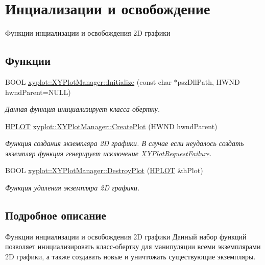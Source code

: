 \hypertarget{group__group1}{\section{Инциализации и освобождение}
\label{group__group1}
}


Функции инциализации и освобождения 2\-D графики  


\subsection*{Функции}
\begin{DoxyCompactItemize}
\item 
B\-O\-O\-L \hyperlink{group__group1_ga894a76ee9162ccae431581ed25c5029f}{xyplot\-::\-X\-Y\-Plot\-Manager\-::\-Initialize} (const char $\ast$psz\-Dll\-Path, H\-W\-N\-D hwnd\-Parent=N\-U\-L\-L)
\begin{DoxyCompactList}\small\item\em Данная функция инициализирует класса-\/обертку. \end{DoxyCompactList}\item 
\hyperlink{classxyplot_1_1_h_p_l_o_t}{H\-P\-L\-O\-T} \hyperlink{group__group1_ga056dc5f3c798c3c3f38d2ac9d4051ecb}{xyplot\-::\-X\-Y\-Plot\-Manager\-::\-Create\-Plot} (H\-W\-N\-D hwnd\-Parent)
\begin{DoxyCompactList}\small\item\em Функция создания экземпляра 2\-D графики. В случае если неудалось создать экземпляр функция генерирует исключение \hyperlink{classxyplot_1_1_x_y_plot_request_failure}{X\-Y\-Plot\-Request\-Failure}. \end{DoxyCompactList}\item 
B\-O\-O\-L \hyperlink{group__group1_gaa1d4729bae2ddfd134d72fcab62930d5}{xyplot\-::\-X\-Y\-Plot\-Manager\-::\-Destroy\-Plot} (\hyperlink{classxyplot_1_1_h_p_l_o_t}{H\-P\-L\-O\-T} \&h\-Plot)
\begin{DoxyCompactList}\small\item\em Функция удаления экземпляра 2\-D графики. \end{DoxyCompactList}\end{DoxyCompactItemize}


\subsection{Подробное описание}
Функции инциализации и освобождения 2\-D графики Данный набор функций позволяет инициализировать класс-\/обертку для манипуляции всеми экземплярами 2\-D графики, а также создавать новые и уничтожать существующие экземпляры. 


